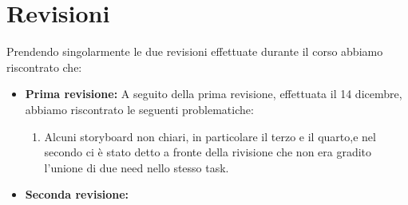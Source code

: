 \documentclass{article}
\begin{document}
\vspace{1cm}


\section{Revisioni}

Prendendo singolarmente le due revisioni effettuate durante il corso abbiamo riscontrato che:
\begin{itemize}\item \textbf{Prima revisione:} A seguito della prima revisione, effettuata il 14 dicembre, abbiamo riscontrato le seguenti problematiche:
    \begin{enumerate}
        \item Alcuni storyboard non chiari, in particolare il terzo e il quarto,e nel secondo ci è stato detto a fronte della rivisione che non era gradito l'unione di due need nello stesso task.
    \end{enumerate}
    \item\textbf{Seconda revisione:}
\end{itemize}
\end{document}
